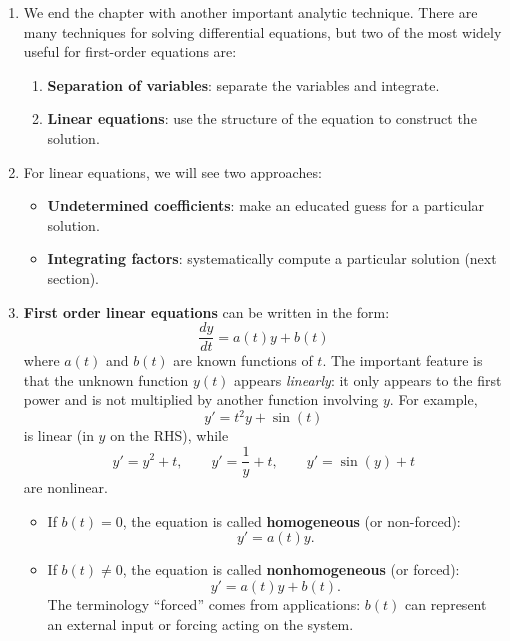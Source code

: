 \documentclass{article}
\begin{document}
\begin{enumerate}

\item We end the chapter with another important analytic technique. There are many techniques for solving differential equations, but two of the most widely useful for first-order equations are:
\begin{enumerate}
\item \textbf{Separation of variables}: separate the variables and integrate.
\item \textbf{Linear equations}: use the structure of the equation to construct the solution.
\end{enumerate}

\item For linear equations, we will see two approaches:
\begin{itemize}
\item \textbf{Undetermined coefficients}: make an educated guess for a particular solution.
\item \textbf{Integrating factors}: systematically compute a particular solution (next section).
\end{itemize}

\item \textbf{First order linear equations} can be written in the form:
\[
\frac{dy}{dt} = a(t)y + b(t)
\] 
where $a(t)$ and $b(t)$ are known functions of $t$. The important feature is that the unknown function $y(t)$ appears \emph{linearly}: it only appears to the first power and is not multiplied by another function involving $y$.
For example,
\[
y'=t^2y+\sin(t)
\]
is linear (in $y$ on the RHS), while
\[
y'=y^2+t,
\qquad
y'=\frac{1}{y}+t,
\qquad
y'=\sin(y)+t
\]
are nonlinear.
\begin{itemize}
\item If $b(t)=0$, the equation is called \textbf{homogeneous} (or non-forced):
\[
y'=a(t)y.
\]
\item If $b(t)\neq 0$, the equation is called \textbf{nonhomogeneous} (or forced):
\[
y'=a(t)y+b(t).
\]
The terminology ``forced'' comes from applications: $b(t)$ can represent an external input or forcing acting on the system.
\end{itemize}


\end{enumerate}
\end{document}
